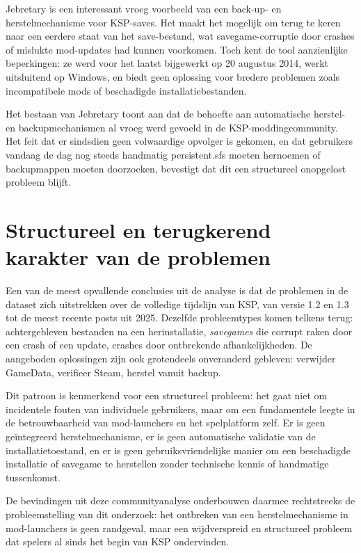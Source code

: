 Jebretary is een interessant vroeg voorbeeld van een back-up- en herstelmechanisme voor KSP-saves. Het maakt het mogelijk om terug te keren naar een eerdere staat van het save-bestand, wat savegame-corruptie door crashes of mislukte mod-updates had kunnen voorkomen. Toch kent de tool aanzienlijke beperkingen: ze werd voor het laatst bijgewerkt op 20 augustus 2014, werkt uitsluitend op Windows, en biedt geen oplossing voor bredere problemen zoals incompatibele mods of beschadigde installatiebestanden.

Het bestaan van Jebretary toont aan dat de behoefte aan automatische herstel- en backupmechanismen al vroeg werd gevoeld in de KSP-moddingcommunity. Het feit dat er sindsdien geen volwaardige opvolger is gekomen, en dat gebruikers vandaag de dag nog steeds handmatig persistent.sfs moeten hernoemen of backupmappen moeten doorzoeken, bevestigt dat dit een structureel onopgelost probleem blijft.

\section{Structureel en terugkerend karakter van de problemen}

Een van de meest opvallende conclusies uit de analyse is dat de problemen in de dataset zich uitstrekken over de volledige tijdslijn van KSP, van versie 1.2 en 1.3 tot de meest recente posts uit 2025. Dezelfde probleemtypes komen telkens terug: achtergebleven bestanden na een herinstallatie, \textit{savegames} die corrupt raken door een crash of een update, crashes door ontbrekende afhankelijkheden. De aangeboden oplossingen zijn ook grotendeels onveranderd gebleven: verwijder GameData, verifieer Steam, herstel vanuit backup.

Dit patroon is kenmerkend voor een structureel probleem: het gaat niet om incidentele fouten van individuele gebruikers, maar om een fundamentele leegte in de betrouwbaarheid van mod-launchers en het spelplatform zelf. Er is geen geïntegreerd herstelmechanisme, er is geen automatische validatie van de installatietoestand, en er is geen gebruiksvriendelijke manier om een beschadigde installatie of savegame te herstellen zonder technische kennis of handmatige tussenkomst.

De bevindingen uit deze communityanalyse onderbouwen daarmee rechtstreeks de probleemstelling van dit onderzoek: het ontbreken van een herstelmechanisme in mod-launchers is geen randgeval, maar een wijdverspreid en structureel probleem dat spelers al sinds het begin van KSP ondervinden.